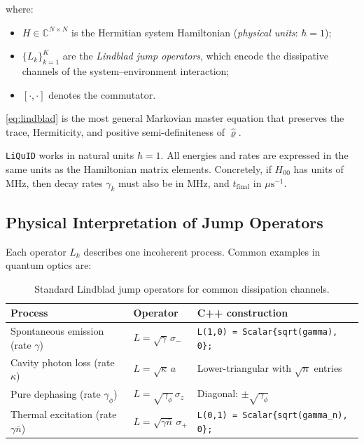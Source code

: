 \documentclass[11pt,a4paper,twoside]{book}
\newcommand{\densmat}{\hat{\varrho}}    %
\newcommand{\complex}{\mathbb{C}}
\newcommand{\liquid}{\texttt{LiQuID}}
\newcommand{\code}[1]{\texttt{\small#1}}
\theoremstyle{definition}
\theoremstyle{remark}
\begin{document}
where:
\begin{itemize}
  \item $H \in \complex^{N \times N}$ is the Hermitian system Hamiltonian
        (\emph{physical units}: $\hbar = 1$);
  \item $\{L_k\}_{k=1}^{K}$ are the \emph{Lindblad jump operators}, which
        encode the dissipative channels of the system--environment interaction;
  \item $[\cdot,\cdot]$ denotes the commutator.
\end{itemize}

\cref{eq:lindblad} is the most general Markovian master equation that
preserves the trace, Hermiticity, and positive semi-definiteness of
$\densmat$.

\begin{notebox}
  \liquid{} works in natural units $\hbar = 1$. All energies and rates
  are expressed in the same units as the Hamiltonian matrix elements.
  Concretely, if $H_{00}$ has units of MHz, then decay rates $\gamma_k$
  must also be in MHz, and $t_{\mathrm{final}}$ in $\mu\mathrm{s}^{-1}$.
\end{notebox}

\subsection{Physical Interpretation of Jump Operators}
\label{subsec:jump-ops}

Each operator $L_k$ describes one incoherent process. Common examples
in quantum optics are:

\begin{table}[H]
\centering
\caption{Standard Lindblad jump operators for common dissipation channels.}
\label{tab:jump-ops}
\begin{tabularx}{\linewidth}{L{38mm}L{38mm}X}
\toprule
\textbf{Process} & \textbf{Operator} & \textbf{C++ construction} \\
\midrule
Spontaneous emission (rate $\gamma$)
  & $L = \sqrt{\gamma}\,\sigma_-$
  & \code{L(1,0) = Scalar\{sqrt(gamma), 0\};} \\[4pt]
Cavity photon loss (rate $\kappa$)
  & $L = \sqrt{\kappa}\,a$
  & Lower-triangular with $\sqrt{n}$ entries \\[4pt]
Pure dephasing (rate $\gamma_\phi$)
  & $L = \sqrt{\gamma_\phi}\,\sigma_z$
  & Diagonal: $\pm\sqrt{\gamma_\phi}$ \\[4pt]
Thermal excitation (rate $\gamma\bar{n}$)
  & $L = \sqrt{\gamma\bar{n}}\,\sigma_+$
  & \code{L(0,1) = Scalar\{sqrt(gamma\_n), 0\};} \\
\bottomrule
\end{tabularx}
\end{table}
\end{document}
